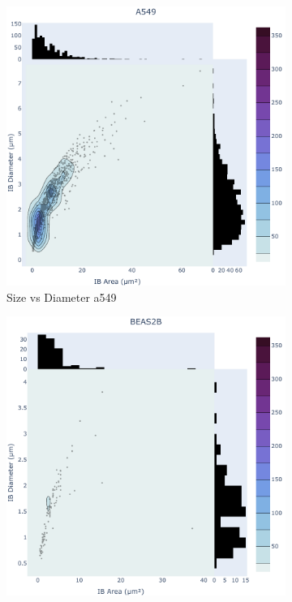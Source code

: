 \begin{figure}
\begin{subfigure}{1\textwidth}
    \end{subfigure}
    \begin{subfigure}{0.3\textwidth}
    \includegraphics[width=1\linewidth]{09. Chapter 4/Figs/01. Localisation introduction/03. heatmap_a549.pdf}
    \caption[]{Size vs Diameter a549}
    \end{subfigure}
    \begin{subfigure}{0.3\textwidth}
    \includegraphics[width=1\linewidth]{09. Chapter 4/Figs/01. Localisation introduction/04. heatmap_beas2b.pdf} 

\end{subfigure}
\end{figure}
